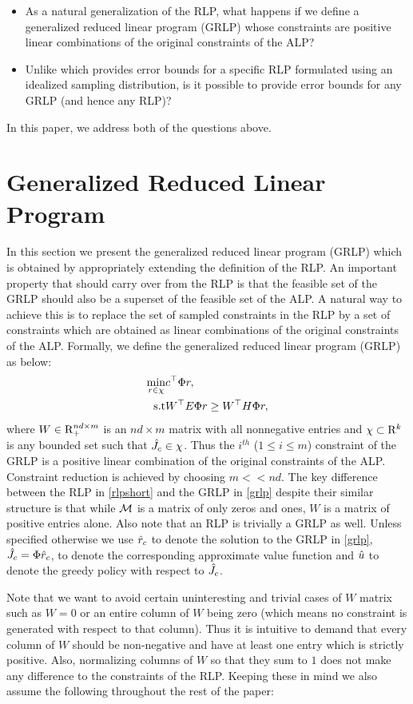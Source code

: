 \documentclass[12pt,draftcls,onecolumn]{IEEEtran}
\begin{document}
\begin{itemize}
\item  As a natural generalization of the RLP, what happens if we define a generalized reduced linear program (GRLP) whose constraints are positive linear combinations of the original constraints of the ALP?
\item Unlike \cite{CS} which provides error bounds for a specific RLP formulated using an idealized sampling distribution, is it possible to provide error bounds for any GRLP (and hence any RLP)?
\end{itemize}
In this paper, we address both of the questions above.

\section{Generalized Reduced Linear Program}
In this section we present the generalized reduced linear program (GRLP) which is obtained by appropriately extending the definition of the RLP. An important property that should carry over from the RLP is that the feasible set of the GRLP should also be a superset of the feasible set of the ALP. A natural way to achieve this is to replace the set of sampled constraints in the RLP by a set of constraints which are obtained as linear combinations of the original constraints of the ALP. Formally, we define the generalized reduced linear program (GRLP) as below:
\begin{align}\label{grlp}
\min_{r\in \chi} &c^\top \Phi r,\nn\\
\text{s.t}\mb & W^\top E\Phi r\geq W^\top H \Phi r, 
\end{align}
where $W \in \mathrm{R}_+^{nd\times m}$ is an $nd\times m$ matrix with all nonnegative entries and $\chi \subset \mathrm{R}^k$ is any bounded set such that $\hat{J}_c \in \chi$. Thus the $i^{th}$ ($1\leq i\leq m$) constraint of the GRLP is a positive linear combination of the original constraints of the ALP. Constraint reduction is achieved by choosing $m<<nd$. The key difference between the RLP in \eqref{rlpshort} and the GRLP in \eqref{grlp} despite their similar structure is that while $\mathcal{M}$ is a matrix of only zeros and ones, $W$ is a matrix of positive entries alone. Also note that an RLP is trivially a GRLP as well. Unless specified otherwise we use $\hat{r}_c$ to denote the solution to the GRLP in \eqref{grlp}, $\hat{J}_c=\Phi \hat{r}_c$, to denote the corresponding approximate value function and $\hat{u}$ to denote the greedy policy with respect to $\hat{J}_c$.\par
Note that we want to avoid certain uninteresting and trivial cases of $W$ matrix such as $W=0$ or an entire column of $W$ being zero (which means no constraint is generated with respect to that column). Thus it is intuitive to demand that every column of $W$ should be non-negative and have at least one entry which is strictly positive. Also, normalizing columns of $W$ so that they sum to $1$ does not make any difference to the constraints of the RLP. Keeping these in mind we also assume the following throughout the rest of the paper:
\end{document}
